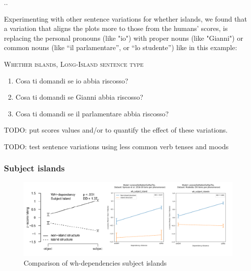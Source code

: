 ..


Experimenting with other sentence variations for whether islands, we found that a variation that aligns the plots more to those from the humans' scores, is replacing the personal pronouns (like "io") with proper nouns (like "Gianni") or common nouns (like “il parlamentare”, or “lo studente”)  like in this example: 

\begin{example}	\textsc{Whether islands, Long-Island sentence type}
	\renewcommand{\labelenumi}{\alph{enumi}.}
	\begin{enumerate}
		\item 
		Cosa ti domandi se io abbia riscosso?
		\item 
		Cosa ti domandi se Gianni abbia riscosso?
		\item 
		Cosa ti domandi se il parlamentare abbia riscosso?
	\end{enumerate}
	\label{variation_2}
\end{example}

TODO: put scores values and/or to quantify the effect of these variations.

TODO: test sentence variations using less common verb tenses and moods  %


\subsubsection{Subject islands}

\begin{figure}[H]
	\centering
	\includegraphics[width=1\textwidth]{images/Chapter1/combined_wh-subject.png} 
	\caption{Comparison of wh-dependencies subject islands} 
	\label{fig:wh_subject} %
\end{figure}


